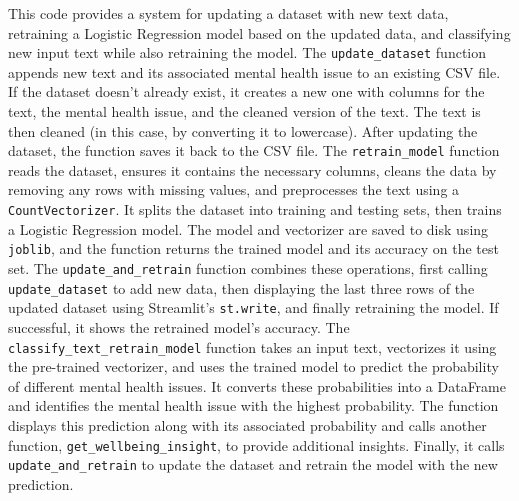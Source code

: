 \noindent
This code provides a system for updating a dataset with new text data, retraining a Logistic Regression model based on the updated data, and classifying new input text while also retraining the model. The \texttt{update\_dataset} function appends new text and its associated mental health issue to an existing CSV file. If the dataset doesn't already exist, it creates a new one with columns for the text, the mental health issue, and the cleaned version of the text. The text is then cleaned (in this case, by converting it to lowercase). After updating the dataset, the function saves it back to the CSV file. The \texttt{retrain\_model} function reads the dataset, ensures it contains the necessary columns, cleans the data by removing any rows with missing values, and preprocesses the text using a \texttt{CountVectorizer}. It splits the dataset into training and testing sets, then trains a Logistic Regression model. The model and vectorizer are saved to disk using \texttt{joblib}, and the function returns the trained model and its accuracy on the test set. The \texttt{update\_and\_retrain} function combines these operations, first calling \texttt{update\_dataset} to add new data, then displaying the last three rows of the updated dataset using Streamlit's \texttt{st.write}, and finally retraining the model. If successful, it shows the retrained model's accuracy. The \texttt{classify\_text\_retrain\_model} function takes an input text, vectorizes it using the pre-trained vectorizer, and uses the trained model to predict the probability of different mental health issues. It converts these probabilities into a DataFrame and identifies the mental health issue with the highest probability. The function displays this prediction along with its associated probability and calls another function, \texttt{get\_wellbeing\_insight}, to provide additional insights. Finally, it calls \texttt{update\_and\_retrain} to update the dataset and retrain the model with the new prediction.

\pagebreak

